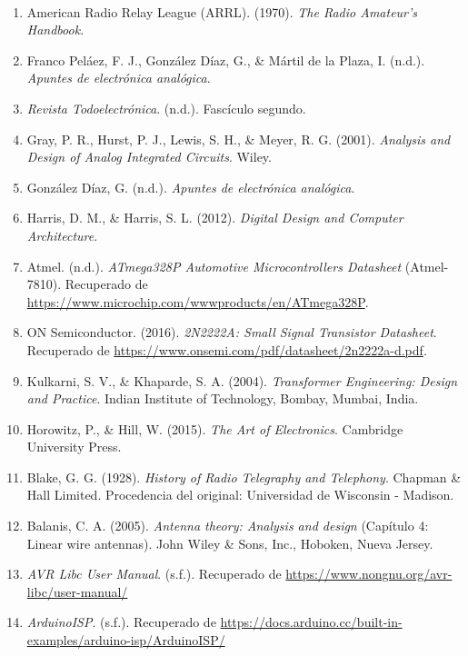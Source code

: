 \paragraph{}
\begin{enumerate}
\item American Radio Relay League (ARRL). (1970). \textit{The Radio Amateur's Handbook}.
\item Franco Peláez, F. J., González Díaz, G., \& Mártil de la Plaza, I. (n.d.). \textit{Apuntes de electrónica analógica}.
\item \textit{Revista Todoelectrónica}. (n.d.). Fascículo segundo.
\item Gray, P. R., Hurst, P. J., Lewis, S. H., \& Meyer, R. G. (2001). \textit{Analysis and Design of Analog Integrated Circuits}. Wiley.
\item González Díaz, G. (n.d.). \textit{Apuntes de electrónica analógica}.
\item Harris, D. M., \& Harris, S. L. (2012). \textit{Digital Design and Computer Architecture}. 
\item Atmel. (n.d.). \textit{ATmega328P Automotive Microcontrollers Datasheet} (Atmel-7810). Recuperado de \url{https://www.microchip.com/wwwproducts/en/ATmega328P}.
\item ON Semiconductor. (2016). \textit{2N2222A: Small Signal Transistor Datasheet}. Recuperado de \url{https://www.onsemi.com/pdf/datasheet/2n2222a-d.pdf}.
\item Kulkarni, S. V., \& Khaparde, S. A. (2004). \textit{Transformer Engineering: Design and Practice}. Indian Institute of Technology, Bombay, Mumbai, India.
\item Horowitz, P., \& Hill, W. (2015). \textit{The Art of Electronics}. Cambridge University Press.
\item {Blake, G. G. (1928). \textit{History of Radio Telegraphy and Telephony}. Chapman \& Hall Limited. Procedencia del original: Universidad de Wisconsin - Madison.}
\item Balanis, C. A. (2005). \textit{Antenna theory: Analysis and design} (Capítulo 4: Linear wire antennas). John Wiley \& Sons, Inc., Hoboken, Nueva Jersey.
\item \textit{AVR Libc User Manual}. (s.f.). Recuperado de \url{https://www.nongnu.org/avr-libc/user-manual/}
\item \textit{ArduinoISP}. (s.f.). Recuperado de \url{https://docs.arduino.cc/built-in-examples/arduino-isp/ArduinoISP/}
\end{enumerate}
